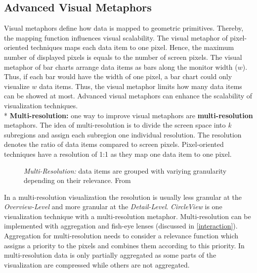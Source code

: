 \subsection{Advanced Visual Metaphors}
Visual metaphors define how data is mapped to geometric primitives. Thereby, the mapping function influences visual scalability. The visual metaphor of pixel-oriented techniques maps each data item to one pixel. Hence, the maximum number of displayed pixels is equals to the number of screen pixels. The visual metaphor of bar charts  arrange data items as bars along the monitor width ($w$). Thus, if each bar would have the width of one pixel, a bar chart could only visualize  $w$ data items. Thus, the visual metaphor limits how many data items can be showed at most. Advanced visual metaphors can enhance the scalability of visualization techniques\cite{Eick2002}. \\*
 \textbf{Multi-resolution:} one way to improve visual metaphors are \textbf{multi-resolution} metaphors\cite{Keim2005}. The idea of multi-resolution is to divide the screen space into \textit{k} subregions and assign each subregion one individual resolution. The resolution denotes the ratio of data items compared to screen pixels. Pixel-oriented techniques have a resolution of 1:1 as they map one data item to one pixel. 
 \begin{figure}
     \centering
     \caption{\textit{Multi-Resolution: }data items are grouped with variying granularity depending on their relevance. From \cite{Keim2005}}
     \label{multi-resolution}
 \end{figure}
 In a multi-resolution visualization the resolution is usually less granular at the \textit{Overview-Level} and more granular at the \textit{Detail-Level}. \textit{CircleView} is one visualization technique with a multi-resolution metaphor.
Multi-resolution can be implemented with aggregation and fish-eye lenses (discussed in \ref{interaction}). Aggregation for multi-resolution needs to consider a relevance function which assigns a priority to the pixels and combines them according to this priority. In multi-resolution data is only partially aggregated as some parts of the visualization are compressed while others are not aggregated.
